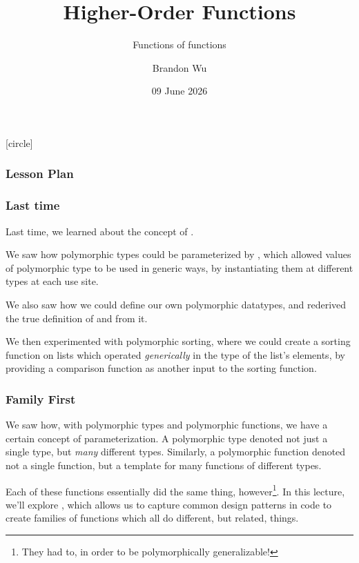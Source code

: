 \documentclass[aspectratio=169]{beamer}
\title{Higher-Order Functions} %
\subtitle{Functions of functions} %
\date{09 June 2026} %
\author{Brandon Wu} %
\newif\ifcolorlambda
\begin{document}
\ifweb
    \renewcommand{\pause}{}
\fi

[circle]

{
\begin{frame}[plain]
    \colorlambdatrue
    \titlepage
\end{frame}
}


\begin{frame}[fragile]
  \frametitle{Lesson Plan}

  \tableofcontents
\end{frame}

\begin{frame}[fragile]
  \frametitle{Last time}

  Last time, we learned about the concept of .

  \pause
  \vspace{\fill}

  We saw how polymorphic types could be parameterized by , which
  allowed values of polymorphic type to be used in generic ways, by instantiating them
  at different types at each use site.

  \pause
  \vspace{\fill}

  We also saw how we could define our own polymorphic datatypes, and rederived the true
  definition of  and  from it.

  \pause
  \vspace{\fill}

  We then experimented with polymorphic sorting, where we could create a sorting function
  on lists which operated \textit{generically} in the type of the list's elements, by providing
  a comparison function as another input to the sorting function.
\end{frame}


\begin{frame}[fragile]
  \frametitle{Family First}

  We saw how, with polymorphic types and polymorphic functions, we have a certain concept
  of parameterization. A polymorphic type denoted not just a single type, but
  \textit{many} different types. Similarly, a polymorphic function denoted not a single
  function, but a template for many functions of different types.

  \pause
  \vspace{\fill}

  Each of these functions essentially did the same thing, however\footnote{They
  had to, in order to be polymorphically generalizable!}. In this lecture, we'll
  explore , which allows us to capture common
  design patterns in code to create families of functions which all do
  different, but related, things.
\end{frame}
\end{document}
